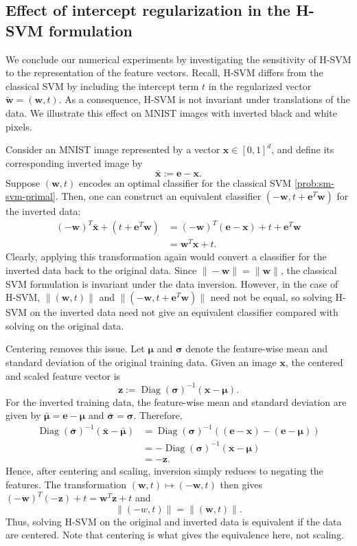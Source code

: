 \documentclass[twoside,11pt]{article}
\newcommand{\bmu}{\bm{\mu}}
\newcommand\w{\bm{w}}
\newcommand\x{\bm{x}}
\newcommand\z{\bm{z}}
\newcommand{\Diag}{\mathop{\mathrm{Diag}}}
\newcommand\e{\bm{e}}
\newcommand\tw{\tilde{\w}}
\newcommand\bsigma{\bm{\sigma}}
\begin{document}
\subsection{Effect of intercept regularization in the H-SVM formulation} \label{sec:mnist-inversion}
We conclude our numerical experiments by investigating the sensitivity of H-SVM to the representation of the feature vectors. Recall, H-SVM differs from the classical SVM by including the intercept term $t$ in the regularized vector $\tw = (\w,t)$. As a consequence, H-SVM is not invariant under translations of the data. We illustrate this effect on MNIST images \citep{MNIST} with inverted black and white pixels.

Consider an MNIST image represented by a vector $\x \in [0,1]^d$, and define its corresponding inverted image by
\[
    \bar{\x} := \e - \x.
\]
Suppose $(\w,t)$ encodes an optimal classifier for the classical SVM \eqref{prob:sm-svm-primal}. Then, one can construct an equivalent classifier $(-\w,t + \e^T\w)$ for the inverted data:
\begin{align*}
    (-\w)^T\bar{\x} + (t + \e^T\w) &= (-\w)^T(\e - \x) + t + \e^T\w\\
                                   &= \w^T\x + t.
\end{align*}
Clearly, applying this transformation again would convert a classifier for the inverted data back to the original data. Since $\|-\w\| = \|\w\|$, the classical SVM formulation is invariant under the data inversion. However, in the case of H-SVM, $\|(\w,t)\|$ and $\|(-\w, t + \e^T\w)\|$ need not be equal, so solving H-SVM on the inverted data need not give an equivalent classifier compared with solving on the original data.

Centering removes this issue. Let $\bmu$ and $\bsigma$ denote the feature-wise mean and standard deviation of the original training data. Given an image $\x$, the centered and scaled feature vector is
\[
    \z := \Diag(\bsigma)^{-1}(\x - \bmu).
\]
For the inverted training data, the feature-wise mean and standard deviation are given by $\bar{\bmu} = \e - \bmu$ and $\bar{\bsigma} = \bsigma$. Therefore,
\begin{align*}
    \Diag(\bar{\bsigma})^{-1}\left(\bar{\x}-\bar{\bmu}\right) &= \Diag(\bsigma)^{-1}\left((\e-\x)-(\e-\bmu)\right)\\
    &= -\Diag(\bsigma)^{-1}(\x-\bmu)\\
    &= -\z.
\end{align*}
Hence, after centering and scaling, inversion simply reduces to negating the features. The transformation $(\w,t) \mapsto (-\w,t)$ then gives $(-\w)^T(-\z) + t = \w^T\z + t$ and
\[
    \|(-w,t)\| = \|(\w,t)\|.
\]
Thus, solving H-SVM on the original and inverted data is equivalent if the data are centered. Note that centering is what gives the equivalence here, not scaling.
\end{document}
